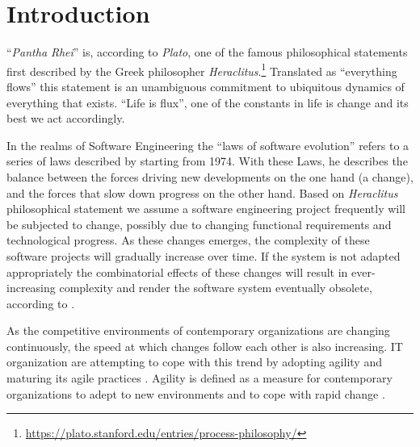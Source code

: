 \chapter{Introduction} \label{introduction}

\enquote{\emph{Pantha Rhei}} is, according to \emph{Plato}, one of the famous
philosophical statements first described by the Greek philosopher
\emph{Heraclitus}.\footnote{\url{https://plato.stanford.edu/entries/process-philosophy/}}
Translated as \enquote{everything flows} this statement is an unambiguous commitment to
ubiquitous dynamics of everything that exists. \enquote{Life is flux}, one of the
constants in life is change and its best we act accordingly.

In the realms of Software Engineering the \enquote{laws of software evolution}
\parencite[]{lehman_programs_1980} refers to a series of laws described by
\citeauthor{lehman_programs_1980} starting from 1974. With these Laws, he describes the
balance between the forces driving new developments on the one hand (a change), and the
forces that slow down progress on the other hand. Based on \emph{Heraclitus} philosophical
statement we assume a software engineering project frequently will be subjected to change,
possibly due to changing functional requirements and technological progress. As these
changes emerges, the complexity of these software projects will gradually increase over
time. If the system is not adapted appropriately the combinatorial effects of these
changes will result in ever-increasing complexity and render the software system
eventually obsolete, according to \citeauthor{lehman_programs_1980}
\parencite[]{lehman_programs_1980}.

As the competitive environments of contemporary organizations are changing continuously,
the speed at which changes follow each other is also increasing. IT organization are
attempting to cope with this trend by adopting agility and maturing its agile practices
\parencite[]{2024_SIM_key_issues_and_trends}. Agility is defined as a measure for
contemporary organizations to adept to new environments and to cope with rapid change
\parencite[]{neumann_strategic_1994}.

